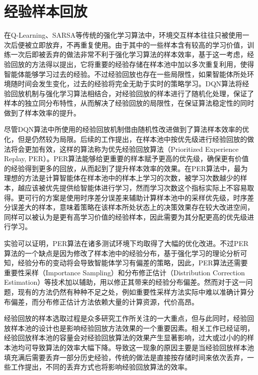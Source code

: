 \section{经验样本回放}

在Q-Learning、SARSA\cite{watkins1992q,sutton2018reinforcement}等传统的强化学习算法中，环境交互样本往往只被使用一次后便被立即放弃，不再重复使用。由于其中的一些样本含有较高的学习价值，训练一次后即被丢弃的做法非常不利于强化学习算法的样本效率，基于这一考虑，经验回放的方法得以提出\cite{lin1992self}，它将重要的经验存储在样本池中加以多次重复利用，使得智能体能够学习过去的经验\cite{adam2011experience}。不过经验回放也存在一些局限性，如果智能体所处环境随时间会发生变化，过去的经验将完全无助于实时的策略学习。DQN算法\cite{mnih2013playing}将经验回放机制与强化学习算法相结合，对经验回放的样本进行了随机化处理，保证了样本的独立同分布特性，从而解决了经验回放的局限性，在保证算法稳定性的同时做到了样本效率的提升。

尽管DQN算法中所使用的经验回放机制借由随机性改进做到了算法样本效率的优化，但是仍然较为局限。后续的工作提出，在样本池中按优先级进行经验回放的做法将会更加有效，这样的算法称为优先经验回放算法（Prioritized Experience Replay, PER）\cite{schaul2015prioritized}。PER算法能够给更重要的样本赋予更高的优先级，确保更有价值的经验得到更多的回放，从而起到了提升样本效率的效果。在PER算法中，最为理想的方法是计算智能体在样本池中的样本上学习的次数，被学习次数越少的样本，越应该被优先提供给智能体进行学习，然而学习次数这个指标实际上不容易取得。更可行的方案是使用时序差分误差来辅助计算样本池中的采样优先级，时序差分误差大的样本，意味着策略在该样本所处状态上的决策效果存在较大改进空间，同样可以被认为是更有高学习价值的经验样本\cite{tesauro1995temporal}，因此需要为其分配更高的优先级进行学习。

实验可以证明，PER算法在诸多测试环境下均取得了大幅的优化改进。不过PER算法的一个缺点是因为修改了样本池中的经验分布，基于强化学习的理论分析可知，经验分布的变动将会导致智能体学习有偏差的策略，因此，PER算法还需要重要性采样（Importance Sampling）\cite{tokdar2010importance}和分布修正估计（Distribution Correction Estimation）\cite{lee2021optidice}等技术加以辅助，用以修正其带来的经验分布偏差。然而对于这一问题，现有的方法仍然有种种不足之处，例如重要性采样方法实际中难以准确计算分布偏差，而分布修正估计方法依赖大量的计算资源，代价高昂。

经验回放的样本选取过程是众多研究工作所关注的一大重点，但与此同时，经验回放样本池的设计也是影响经验回放方法效果的一个重要因素。相关工作已经证明，经验回放样本池的容量会对经验回放算法的效果产生显著影响，过大或过小的的样本池均可导致算法的效率大幅下降\cite{zhang2017deeper}。导致这一现象的原因主要是当经验回放样本池填充满后需要丢弃一部分历史经验，传统的做法是直接按存储时间来依次丢弃，一些工作提出，不同的丢弃方式也将影响经验回放算法的效率\cite{pieters2016q}。

